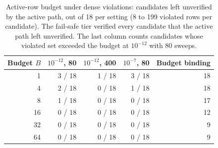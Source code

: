 \begin{table}[h]
\centering
\caption{Active-row budget under dense violations: candidates left unverified by the active path, out of 18 per setting (8 to 199 violated rows per candidate). The fail-safe tier verified every candidate that the active path left unverified. The last column counts candidates whose violated set exceeded the budget at $10^{-12}$ with 80 sweeps.}
\label{tab:ext-budget}
\begin{tabular}{@{}rrrrr@{}}
\toprule
Budget $B$ & $10^{-12}$, 80 & $10^{-12}$, 400 & $10^{-7}$, 80 & Budget binding \\
\midrule
1 & 3 / 18 & 1 / 18 & 3 / 18 & 18 \\
4 & 2 / 18 & 0 / 18 & 1 / 18 & 18 \\
8 & 1 / 18 & 0 / 18 & 0 / 18 & 17 \\
16 & 0 / 18 & 0 / 18 & 0 / 18 & 12 \\
32 & 0 / 18 & 0 / 18 & 0 / 18 & 9 \\
64 & 0 / 18 & 0 / 18 & 0 / 18 & 9 \\
\bottomrule
\end{tabular}
\end{table}
